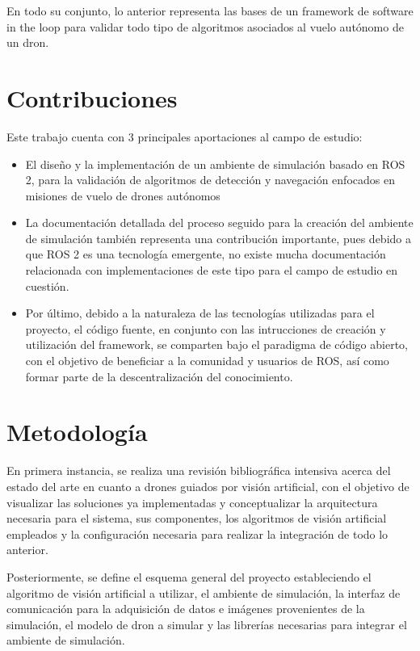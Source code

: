En todo su conjunto, lo anterior representa las bases de un framework de software in the loop para validar todo tipo de algoritmos asociados al vuelo autónomo de un dron.

\section{Contribuciones}

Este trabajo cuenta con 3 principales aportaciones al campo de estudio:

\begin{itemize}
    \item El diseño y la implementación de un ambiente de simulación basado en ROS 2, para la validación de algoritmos de detección y navegación enfocados en misiones de vuelo de drones autónomos
    \item La documentación detallada del proceso seguido para la creación del ambiente de simulación también representa una contribución importante, pues debido a que ROS 2 es una tecnología emergente, no existe mucha documentación relacionada con implementaciones de este tipo para el campo de estudio en cuestión.
    \item Por último, debido a la naturaleza de las tecnologías utilizadas para el proyecto, el código fuente, en conjunto con las intrucciones de creación y utilización del framework, se comparten bajo el paradigma de código abierto, con el objetivo de beneficiar a la comunidad y usuarios de ROS, así como formar parte de la descentralización del conocimiento.
\end{itemize}


\section{Metodología}

En primera instancia, se realiza una revisión bibliográfica intensiva acerca del estado del arte en cuanto a drones guiados por visión artificial, con el objetivo de visualizar las soluciones ya implementadas y conceptualizar la arquitectura necesaria para el sistema, sus componentes, los algoritmos de visión artificial empleados y la configuración necesaria para realizar la integración de todo lo anterior.

Posteriormente, se define el esquema general del proyecto estableciendo el algoritmo de visión artificial a utilizar, el ambiente de simulación, la interfaz de comunicación para la adquisición de datos e imágenes provenientes de la simulación, el modelo de dron a simular y las librerías necesarias para integrar el ambiente de simulación.

